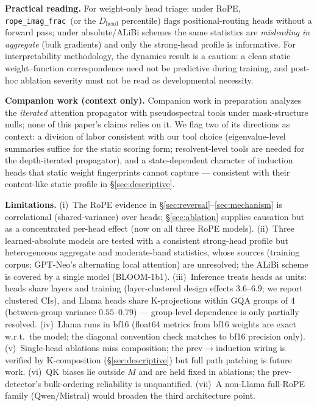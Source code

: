 \documentclass[11pt]{article}
\newcommand{\Dhead}{\ensuremath{D_{\text{head}}}\xspace}
\newcommand{\ropeimag}{\texttt{rope\_imag\_frac}\xspace}
\newcommand{\M}{\ensuremath{M}\xspace}
\newcommand{\Rope}{RoPE\xspace}
\begin{document}
\textbf{Practical reading.} For weight-only head triage: under \Rope, \ropeimag\ (or the \Dhead percentile) flags
positional-routing heads without a forward pass; under absolute/ALiBi schemes the same statistics are
\emph{misleading in aggregate} (bulk gradients) and only the strong-head profile is informative. For
interpretability methodology, the dynamics result is a caution: a clean static weight--function correspondence
need not be predictive during training, and post-hoc ablation severity must not be read as developmental necessity.

\textbf{Companion work (context only).} Companion work in preparation analyzes the \emph{iterated} attention
propagator with pseudospectral tools under mask-structure nulls; none of this paper's claims relies on it. We flag
two of its directions as context: a division of labor consistent with our tool choice (eigenvalue-level summaries
suffice for the static scoring form; resolvent-level tools are needed for the depth-iterated propagator), and a
state-dependent character of induction heads that static weight fingerprints cannot capture --- consistent with
their content-like static profile in \S\ref{sec:descriptive}.

\textbf{Limitations.} (i)~The \Rope evidence in \S\ref{sec:reversal}--\ref{sec:mechanism} is correlational
(shared-variance) over heads; \S\ref{sec:ablation} supplies causation but as a concentrated per-head effect (now on
all three \Rope models). (ii)~Three learned-absolute models are tested with a consistent strong-head profile but heterogeneous aggregate and
moderate-band statistics, whose sources (training corpus; GPT-Neo's alternating local attention) are unresolved; the ALiBi scheme is covered
by a single model (BLOOM-1b1). (iii)~Inference treats heads as units: heads share layers and training (layer-clustered
design effects $3.6$--$6.9$; we report clustered CIs), and Llama heads share K-projections within GQA groups of 4
(between-group variance $0.55$--$0.79$) --- group-level dependence is only partially resolved. (iv)~Llama runs in
bf16 (float64 metrics from bf16 weights are exact w.r.t.\ the model; the diagonal convention check matches to bf16
precision only). (v)~Single-head ablations miss composition; the prev$\to$induction wiring is verified by K-composition
(\S\ref{sec:descriptive}) but full path patching is future work.
(vi)~QK biases lie outside \M and are held fixed in ablations; the prev-detector's bulk-ordering reliability is
unquantified. (vii)~A non-Llama full-\Rope family
(Qwen/Mistral) would broaden the third architecture point.
\end{document}
